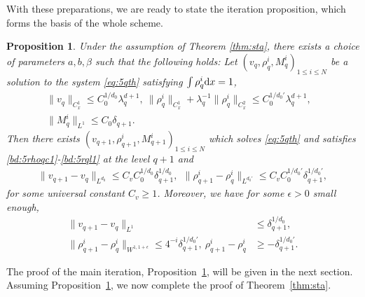 \documentclass[UTF-8,reqno]{amsart}
\numberwithin{equation}{section}
\newtheorem{proposition}[theorem]{Proposition}
\theoremstyle{definition}
\def\dif{{\mathord{{\rm d}}}}
\def\geq{\geqslant}
\def\leq{\leqslant}
\def\dif{{\mathord{{\rm d}}}}
\def\bp{\begin{proposition}}
\def\ep{\end{proposition}}
\def\geq{\geqslant}
\def\leq{\leqslant}
\begin{document}
     
With these preparations, we are ready to state the iteration proposition, which forms the basis of the whole scheme.

 
\bp\label{prop:sta}
Under the assumption of Theorem \ref{thm:sta}, there exists  a choice of parameters $a,b,\beta$  such
that the following holds: Let $(v_q,  \rho^i_q,  M^i_q)_{1\leq i \leq N}$ be a solution to the system \eqref{eq:5qth} satisfying  $\int  \rho^i_q\dif x=1$,
\begin{align}
\|v_q\|_ {C_{x}^1}\leq C_0^{1/d_0}\lambda_q^{ d+1},\
\|  \rho^i_{q}\|_ {C_{x}^1}+\lambda_q^{-1}\|  \rho^i_{q}\|_ {C_{x}^2}\leq C_0^{1/d_0'} \lambda_q^{ d+1},
\label{bd:5rhoqc1}\\
 \|M^i_q\|_{L^1}\leq C_0 \delta_{q+1}.&\label{bd:5rql1}
\end{align}
Then there exists 
$(v_{q+1},  \rho^i_{q+1},  M^i_{q+1})_{1\leq i \leq N}$ which solves \eqref{eq:5qth} and satisfies \eqref{bd:5rhoqc1}-\eqref{bd:5rql1} at the level $q+1$ and
\begin{align}
\|v_{q+1}-v_{q}\|_{L^{d_0}}\leq
C_vC_0^{1/d_0}\delta_{q+1}^{1/d_0},\label{bd:5vq+1-vqldd}\ \
\|  \rho^i_{q+1}-  \rho^i_{q}\|_{L^{d_0'}}\leq 
C_v C_0^{1/{d_0'}}\delta_{q+1}^{1/{d_0'}},%
\end{align}for some universal constant $C_v\geq1$. 
Moreover, we have for some $\epsilon>0$ small enough,
\begin{align}
     \|v_{q+1}-v_{q}\|_{L^{1}}&\leq \delta_{q+1}^{1/d_0},\label{bd:5vq+1-vql1}\\
 \|  \rho^i_{q+1}-  \rho^i_{q}\|_{W^{1,1+\epsilon}}\leq 
 4^{-i}\delta_{q+1}^{1/d_0'},\   \rho^i_{q+1} -   \rho^i_q&\geq - \delta_{q+1}^{1/d_0'}.\label{bd:5rhoq+1-rhoql1}
\end{align}
\ep

The proof of the main iteration, Proposition~\ref{prop:sta}, will be given in the next section. 
Assuming Proposition~\ref{prop:sta}, we now complete the proof of Theorem~\ref{thm:sta}.
 
\end{document}

